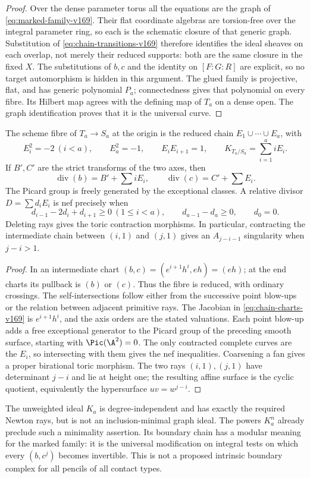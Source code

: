 \begin{proof}
Over the dense parameter torus all the equations are the graph of
\eqref{eq:marked-family-v169}. Their flat coordinate algebras are
torsion-free over the integral parameter ring, so each is the
schematic closure of that generic graph. Substitution of
\eqref{eq:chain-transitions-v169} therefore identifies the ideal
sheaves on each overlap, not merely their reduced supports: both are
the same closure in the fixed $X$. The substitutions of $b,c$ and the
identity on $[F:G:R]$ are explicit, so no target automorphism is hidden
in this argument. The glued family is projective, flat, and has generic
polynomial $P_a$; connectedness gives that polynomial on every fibre.
Its Hilbert map agrees with the defining map of $T_a$ on a dense open.
The graph identification proves that it is the universal curve.
\end{proof}

\begin{proposition}\label{prop:boundary-v169}
The scheme fibre of $T_a\to S_a$ at the origin is the reduced chain
$E_1\cup\cdots\cup E_a$, with
\[
 E_i^2=-2\ (i<a),\qquad E_a^2=-1,\qquad
 E_iE_{i+1}=1,
 \qquad K_{T_a/S_a}=\sum_{i=1}^a iE_i.
\]
If $B',C'$ are the strict transforms of the two axes, then
\[
 \operatorname{div}(b)=B'+\sum iE_i,\qquad
 \operatorname{div}(c)=C'+\sum E_i.
\]
The Picard group is freely generated by the exceptional classes. A
relative divisor $D=\sum d_iE_i$ is nef precisely when
\[
 d_{i-1}-2d_i+d_{i+1}\geq0\ (1\leq i<a),\qquad
 d_{a-1}-d_a\geq0,\qquad d_0=0.
\]
Deleting rays gives the toric contraction morphisms. In particular,
contracting the intermediate chain between $(i,1)$ and $(j,1)$ gives
an $A_{j-i-1}$ singularity when $j-i>1$.
\end{proposition}
\begin{proof}
In an intermediate chart $(b,c)=(e^{i+1}h^i,eh)=(eh)$; at the end
charts its pullback is $(b)$ or $(c)$. Thus the fibre is reduced, with
ordinary crossings. The self-intersections follow either from the
successive point blow-ups or the relation between adjacent primitive
rays. The Jacobian in \eqref{eq:chain-charts-v169} is
$e^{i+1}h^i$, and the axis orders are the stated valuations. Each
point blow-up adds a free exceptional generator to the Picard group
of the preceding smooth surface, starting with $\Pic(\A^2)=0$.
The only contracted complete curves are the $E_i$, so intersecting
with them gives the nef inequalities. Coarsening a fan gives a proper
birational toric morphism. The two rays $(i,1),(j,1)$ have determinant
$j-i$ and lie at height one; the resulting affine surface is the
cyclic quotient, equivalently the hypersurface $uv=w^{j-i}$.
\end{proof}
The unweighted ideal $K_a$ is degree-independent and has exactly the
required Newton rays, but is not an inclusion-minimal graph ideal.
The powers $K_a^n$ already preclude such a minimality assertion. Its
boundary chain has a modular meaning for the marked family: it is the
universal modification on integral tests on which every $(b,c^j)$
becomes invertible. This is not a proposed intrinsic boundary complex
for all pencils of all contact types.
